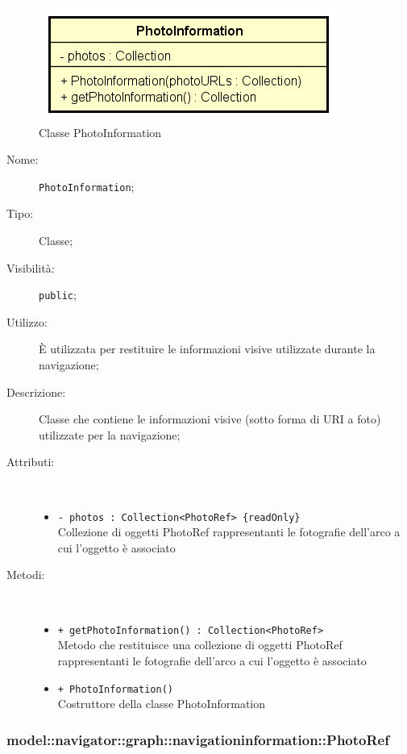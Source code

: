 \documentclass[../DefinizioneDiProdotto.tex]{subfiles}
\begin{document}
    \begin{figure}[H]
        \centering
        \includegraphics{img/PhotoInformation.png}
        \caption{Classe PhotoInformation}\label{fig:model::navigator::graph::navigationinformation::PhotoInformation} 
    \end{figure}
    \begin{description}
\item[Nome:] \texttt{PhotoInformation};
\item[Tipo:] Classe;
\item[Visibilità:] \texttt{public};
\item[Utilizzo:] È utilizzata per restituire le informazioni visive utilizzate durante la navigazione;
\item[Descrizione:] Classe che contiene le informazioni visive (sotto forma di URI a foto) utilizzate per la navigazione;
\item[Attributi:] \
\begin{itemize}
\item \texttt{- photos : Collection<PhotoRef> \{readOnly\}}\\
Collezione di oggetti PhotoRef rappresentanti le fotografie dell'arco a cui l'oggetto è associato

\end{itemize}
\item[Metodi:] \
\begin{itemize}
\item \texttt{+ getPhotoInformation() : Collection<PhotoRef>}\\
Metodo che restituisce una collezione di oggetti PhotoRef rappresentanti le fotografie dell'arco a cui l'oggetto è associato
 \item \texttt{+ PhotoInformation()}\\
Costruttore della classe PhotoInformation
 \end{itemize}
\end{description}

\subsubsection{model::navigator::graph::navigationinformation::PhotoRef}
\end{document}

